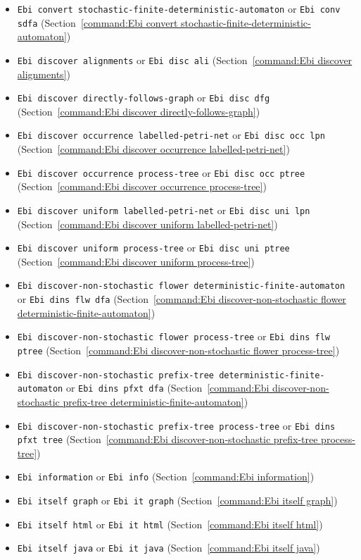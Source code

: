 {\begin{itemize}
\item\texttt{Ebi convert stochastic-finite-deterministic-automaton} or \texttt{Ebi conv sdfa} (Section~\ref{command:Ebi convert stochastic-finite-deterministic-automaton})
\item\texttt{Ebi discover alignments} or \texttt{Ebi disc ali} (Section~\ref{command:Ebi discover alignments})
\item\texttt{Ebi discover directly-follows-graph} or \texttt{Ebi disc dfg} (Section~\ref{command:Ebi discover directly-follows-graph})
\item\texttt{Ebi discover occurrence labelled-petri-net} or \texttt{Ebi disc occ lpn} (Section~\ref{command:Ebi discover occurrence labelled-petri-net})
\item\texttt{Ebi discover occurrence process-tree} or \texttt{Ebi disc occ ptree} (Section~\ref{command:Ebi discover occurrence process-tree})
\item\texttt{Ebi discover uniform labelled-petri-net} or \texttt{Ebi disc uni lpn} (Section~\ref{command:Ebi discover uniform labelled-petri-net})
\item\texttt{Ebi discover uniform process-tree} or \texttt{Ebi disc uni ptree} (Section~\ref{command:Ebi discover uniform process-tree})
\item\texttt{Ebi discover-non-stochastic flower deterministic-finite-automaton} or \texttt{Ebi dins flw dfa} (Section~\ref{command:Ebi discover-non-stochastic flower deterministic-finite-automaton})
\item\texttt{Ebi discover-non-stochastic flower process-tree} or \texttt{Ebi dins flw ptree} (Section~\ref{command:Ebi discover-non-stochastic flower process-tree})
\item\texttt{Ebi discover-non-stochastic prefix-tree deterministic-finite-automaton} or \texttt{Ebi dins pfxt dfa} (Section~\ref{command:Ebi discover-non-stochastic prefix-tree deterministic-finite-automaton})
\item\texttt{Ebi discover-non-stochastic prefix-tree process-tree} or \texttt{Ebi dins pfxt tree} (Section~\ref{command:Ebi discover-non-stochastic prefix-tree process-tree})
\item\texttt{Ebi information} or \texttt{Ebi info} (Section~\ref{command:Ebi information})
\item\texttt{Ebi itself graph} or \texttt{Ebi it graph} (Section~\ref{command:Ebi itself graph})
\item\texttt{Ebi itself html} or \texttt{Ebi it html} (Section~\ref{command:Ebi itself html})
\item\texttt{Ebi itself java} or \texttt{Ebi it java} (Section~\ref{command:Ebi itself java})

\end{itemize}}
